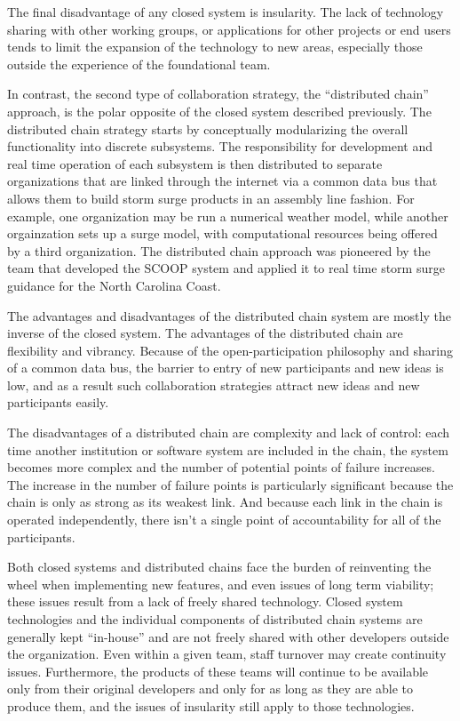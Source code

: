 \documentclass[jmse,article,submit,moreauthors,pdftex,12pt,a4paper]{mdpi}
\begin{document}
The final disadvantage of any closed system is insularity. The lack 
of technology sharing with other working groups, or applications for 
other projects or end users tends to limit the expansion of the 
technology to new areas, especially those outside the experience of 
the foundational team. 

In contrast, the second type of collaboration strategy, the 
``distributed chain'' approach, is the polar opposite of the closed 
system described previously. The distributed chain strategy starts 
by conceptually modularizing the overall functionality into discrete 
subsystems. The responsibility for development and real time 
operation of each subsystem is then distributed to separate 
organizations that are linked through the internet via a common data 
bus that allows them to build storm surge products in an assembly 
line fashion. For example, one organization may be run a numerical 
weather model, while another orgainzation sets up a surge model, 
with computational resources being offered by a third organization. 
The distributed chain approach was pioneered by the team that 
developed the SCOOP system and applied it to real time storm surge 
guidance for the North Carolina Coast. \cite{RamakrishnanL2006}

The advantages and disadvantages of the distributed chain system are 
mostly the inverse of the closed system. The advantages of the 
distributed chain are flexibility and vibrancy. Because of the 
open-participation philosophy and sharing of a common data bus, the 
barrier to entry of new participants and new ideas is low, and as a 
result such collaboration strategies attract new ideas and new 
participants easily.

The disadvantages of a distributed chain are complexity and lack of 
control: each time another institution or software system are 
included in the chain, the system becomes more complex and the 
number of potential points of failure increases. The increase in the 
number of failure points is particularly significant because the 
chain is only as strong as its weakest link. And because each link 
in the chain is operated independently, there isn't a single point 
of accountability for all of the participants.

Both closed systems and distributed chains face the burden of 
reinventing the wheel when implementing new features, and even 
issues of long term viability; these issues result from a lack of 
freely shared technology. Closed system technologies and the 
individual components of distributed chain systems are generally 
kept ``in-house'' and are not freely shared with other developers 
outside the organization. Even within a given team, staff turnover 
may create continuity issues. Furthermore, the products of these 
teams will continue to be available only from their original 
developers and only for as long as they are able to produce them, 
and the issues of insularity still apply to those technologies.
\end{document}
